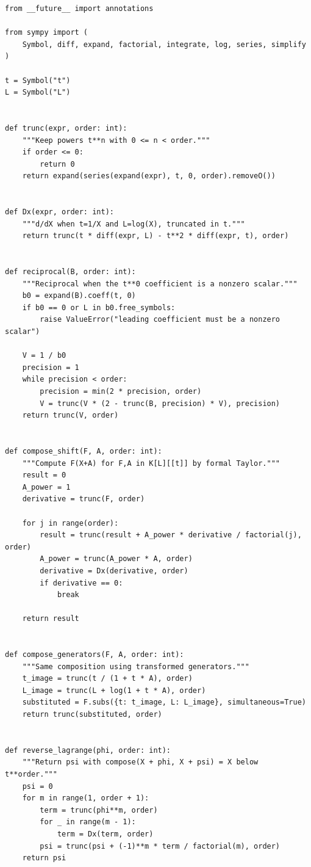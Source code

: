 \documentclass[11pt,oneside,openany]{book}
\begin{document}
\begin{lstlisting}[style=pythonstyle,caption={Reference implementation for the discrete polynomial-logarithmic ring.},label={lst:implementation}]
from __future__ import annotations

from sympy import (
    Symbol, diff, expand, factorial, integrate, log, series, simplify
)

t = Symbol("t")
L = Symbol("L")


def trunc(expr, order: int):
    """Keep powers t**n with 0 <= n < order."""
    if order <= 0:
        return 0
    return expand(series(expand(expr), t, 0, order).removeO())


def Dx(expr, order: int):
    """d/dX when t=1/X and L=log(X), truncated in t."""
    return trunc(t * diff(expr, L) - t**2 * diff(expr, t), order)


def reciprocal(B, order: int):
    """Reciprocal when the t**0 coefficient is a nonzero scalar."""
    b0 = expand(B).coeff(t, 0)
    if b0 == 0 or L in b0.free_symbols:
        raise ValueError("leading coefficient must be a nonzero scalar")

    V = 1 / b0
    precision = 1
    while precision < order:
        precision = min(2 * precision, order)
        V = trunc(V * (2 - trunc(B, precision) * V), precision)
    return trunc(V, order)


def compose_shift(F, A, order: int):
    """Compute F(X+A) for F,A in K[L][[t]] by formal Taylor."""
    result = 0
    A_power = 1
    derivative = trunc(F, order)

    for j in range(order):
        result = trunc(result + A_power * derivative / factorial(j), order)
        A_power = trunc(A_power * A, order)
        derivative = Dx(derivative, order)
        if derivative == 0:
            break

    return result


def compose_generators(F, A, order: int):
    """Same composition using transformed generators."""
    t_image = trunc(t / (1 + t * A), order)
    L_image = trunc(L + log(1 + t * A), order)
    substituted = F.subs({t: t_image, L: L_image}, simultaneous=True)
    return trunc(substituted, order)


def reverse_lagrange(phi, order: int):
    """Return psi with compose(X + phi, X + psi) = X below t**order."""
    psi = 0
    for m in range(1, order + 1):
        term = trunc(phi**m, order)
        for _ in range(m - 1):
            term = Dx(term, order)
        psi = trunc(psi + (-1)**m * term / factorial(m), order)
    return psi



\end{lstlisting}
\end{document}
